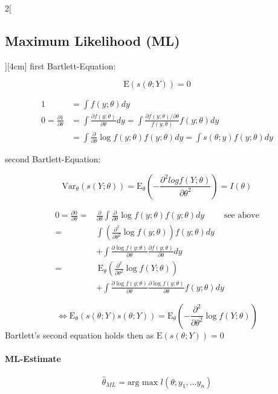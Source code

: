 \documentclass[8pt]{extarticle}
\begin{document}
\begin{multicols}{2}[\subsection{Maximum Likelihood (ML)}][4cm]
  first Bartlett-Equation:
  
  $$\mathrm{E}\left(s(\theta;Y)\right) = 0$$
  
\begin{Proof}
\vspace{-1.5em}
\begin{align*}
1 &= \int f(y;\theta) dy \\
0 = \frac{\partial 1}{\partial\theta} &= \int \frac{\partial f(y;\theta)}{\partial \theta}dy = \int \frac{\partial f(y;\theta) / \partial\theta}{f(y;\theta)} f(y;\theta) dy \\ &= \int \frac{\partial}{\partial\theta} \log f(y;\theta) f(y;\theta) dy = \int s(\theta;y) f(y;\theta) dy
\end{align*}
\end{Proof}
  
  second Bartlett-Equation:
  
  $$\mathrm{Var}_\theta\left(s(Y;\theta)\right) = \mathrm{E}_\theta\left(-\frac{\partial^2 log f(Y;\theta)}{\partial\theta^2}\right) = I(\theta)$$
  
\begin{Proof}
\vspace{-1.5em}
\begin{align*}
0 = \frac{\partial 0}{\partial \theta} =& \frac{\partial}{\partial\theta}\int \frac{\partial}{\partial\theta} \log f(y;\theta) f(y;\theta) dy \hspace{2em}\text{      see above}\\
=& \int \left( \frac{\partial^2}{\partial \theta^2} \log f(y;\theta)\right) f(y;\theta) dy  \\
&+ \int\frac{\partial \log f(y;\theta)}{\partial \theta}\frac{\partial f(y;\theta)}{\partial \theta}dy \\
=& \: \mathrm{E}_\theta \left( \frac{\partial^2}{\partial \theta^2} \log f(Y;\theta)\right)  \\
&+ \int\frac{\partial \log f(y;\theta)}{\partial \theta}\frac{\partial \log f(y;\theta)}{\partial \theta} f(y;\theta) dy 
\end{align*}

$$\Leftrightarrow \mathrm{E}_\theta \left(s(\theta;Y) s(\theta;Y)\right) = \mathrm{E}_\theta \left(- \frac{\partial^2}{\partial \theta^2} \log f(Y;\theta)\right)$$
\noindent Bartlett's second equation holds then as $\mathrm{E}\left(s(\theta;Y)\right) = 0$
\end{Proof}
  
  \paragraph{ML-Estimate}
   $$\hat{\theta}_{ML} = \text{arg max } l(\theta; y_1,...y_n)$$
   

\end{multicols}
\end{document}
